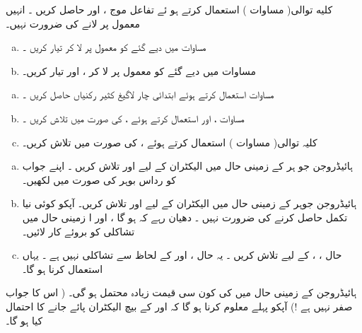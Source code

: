 کلیه توالی( مساوات )  استعمال کرتے ہو ئے  تفاعل موج   ،  اور  حاصل کریں ۔ انہیں معمول پر لانے کی ضرورت نہیں۔ 
\begin{enumerate}[a.]
\item
مساوات    میں دیے گئے  کو معمول پر لا کر  تیار کریں ۔
\item
مساوات    میں دیے گئے    کو معمول پر لا کر  ،   اور    تیار کریں۔ 
\end{enumerate}
\begin{enumerate}[a.]
\item
مساوات   استعمال کرتے ہوئے ابتدائی چار لاگیغ کثیر رکنیاں حاصل کریں ۔
\item
مساوات  ،   اور  استعمال کرتے ہوئے   ،     کی صورت میں   تلاش کریں ۔
\item
کلیہ توالی( مساوات )  استعمال کرتے ہوئے  ،     کی صورت میں   تلاش کریں۔ 
\end{enumerate}
\begin{enumerate}[a.]
\item
ہائیڈروجن جو ہر کے زمینی حال میں الیکٹران   کے لیے   اور  تلاش کریں ۔  اپنے جواب کو رداس بوہر کی صورت میں لکھیں۔ 
\item
ہائیڈروجن جوہر کے زمینی حال میں الیکٹران  کے لیے    اور   تلاش کریں۔    آپکو کوئی نیا تکمل حاصل کرنے کی ضرورت نہیں ۔ دھیان  رہے کہ 
   ہو گا    ، اور ا  زمینی حال میں تشاکلی کو بروئے کار لائیں۔ 
\item
حال  ، ،  کے لیے  تلاش کریں ۔     یہ حال  ،  اور  کے لحاظ سے  تشاکلی نہیں ہے ۔ یہاں
  استعمال کرنا  ہو گا۔ 
\end{enumerate}
ہائیڈروجن کے زمینی حال میں   کی کون سی قیمت زیادہ محتمل ہو گی۔ ( اس کا جواب صفر نہیں ہے !)    آپکو پہلے  معلوم کرنا ہو گا کہ  اور  کے بیچ  الیکٹران  پائے جانے کا احتمال کیا ہو گا۔
